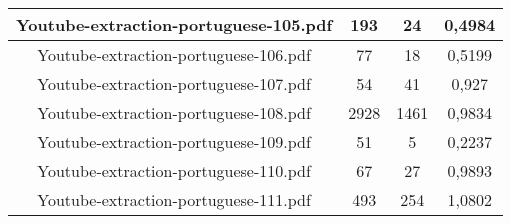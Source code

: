 \documentclass[11pt]{article}
\newlength\mylength
\begin{document}
\begin{center}
\begin{longtable}{||C{.40\mylength}||C{.30\mylength}||C{.30\mylength}||C{.30\mylength}||}
  Youtube-extraction-portuguese-105.pdf & 193 & 24 & 0,4984 \\  \hline
  Youtube-extraction-portuguese-106.pdf & 77 & 18 & 0,5199 \\  \hline
  Youtube-extraction-portuguese-107.pdf & 54 & 41 & 0,927 \\  \hline
  Youtube-extraction-portuguese-108.pdf & 2928 & 1461 & 0,9834 \\  \hline
  Youtube-extraction-portuguese-109.pdf & 51 & 5 & 0,2237 \\  \hline
  Youtube-extraction-portuguese-110.pdf & 67 & 27 & 0,9893 \\  \hline
  Youtube-extraction-portuguese-111.pdf & 493 & 254 & 1,0802 \\  \hline
  
\end{longtable}
\end{center}
\end{document}
